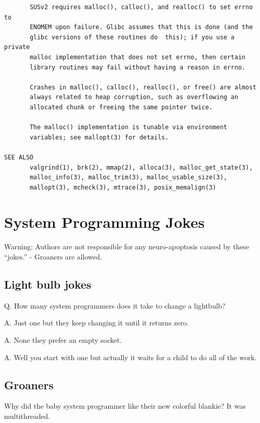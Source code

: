 {\begin{center}
\begin{verbatim}
       SUSv2 requires malloc(), calloc(), and realloc() to set errno to
       ENOMEM upon failure. Glibc assumes that this is done (and the
       glibc versions of these routines do  this); if you use a private
       malloc implementation that does not set errno, then certain
       library routines may fail without having a reason in errno.

       Crashes in malloc(), calloc(), realloc(), or free() are almost
       always related to heap corruption, such as overflowing an
       allocated chunk or freeing the same pointer twice. 

       The malloc() implementation is tunable via environment
       variables; see mallopt(3) for details. 

SEE ALSO
       valgrind(1), brk(2), mmap(2), alloca(3), malloc_get_state(3),
       malloc_info(3), malloc_trim(3), malloc_usable_size(3),
       mallopt(3), mcheck(3), mtrace(3), posix_memalign(3)
\end{verbatim}
\end{center}
}

\section{System Programming Jokes}


Warning: Authors are not responsible for any neuro-apoptosis caused by these ``jokes.'' - Groaners are allowed.

\subsection{Light bulb jokes}

Q. How many system programmers does it take to change a lightbulb?

A. Just one but they keep changing it until it returns zero.

A. None they prefer an empty socket.

A. Well you start with one but actually it waits for a child to do all of the work.

\subsection{Groaners}

Why did the baby system programmer like their new colorful blankie? It was multithreaded.

